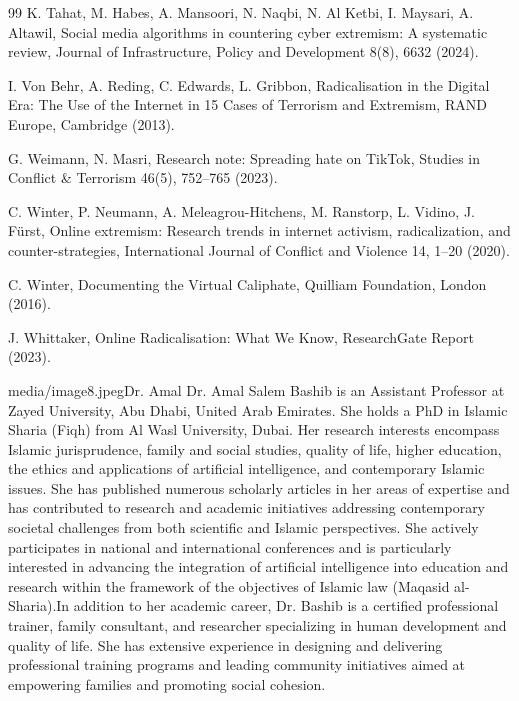 \documentclass{NSP1}
\begin{document}
\begin{thebibliography}{99}
K. Tahat, M. Habes, A. Mansoori, N. Naqbi, N. Al Ketbi, I. Maysari, A. Altawil, Social media algorithms in countering cyber extremism: A systematic review, Journal of Infrastructure, Policy and Development 8(8), 6632 (2024).

I. Von Behr, A. Reding, C. Edwards, L. Gribbon, Radicalisation in the Digital Era: The Use of the Internet in 15 Cases of Terrorism and Extremism, RAND Europe, Cambridge (2013).

G. Weimann, N. Masri, Research note: Spreading hate on TikTok, Studies in Conflict \& Terrorism 46(5), 752–765 (2023).

C. Winter, P. Neumann, A. Meleagrou-Hitchens, M. Ranstorp, L. Vidino, J. Fürst, Online extremism: Research trends in internet activism, radicalization, and counter-strategies, International Journal of Conflict and Violence 14, 1–20 (2020).

C. Winter, Documenting the Virtual Caliphate, Quilliam Foundation, London (2016).

J. Whittaker, Online Radicalisation: What We Know, ResearchGate Report (2023).

\end{thebibliography}




\begin{biographyps}{media/image8.jpeg}{Dr. Amal}
Dr. Amal Salem Bashib is an Assistant Professor at Zayed University, Abu Dhabi, United Arab Emirates. She holds a PhD in Islamic Sharia (Fiqh) from Al Wasl University, Dubai. Her research interests encompass Islamic jurisprudence, family and social studies, quality of life, higher education, the ethics and applications of artificial intelligence, and contemporary Islamic issues. She has published numerous scholarly articles in her areas of expertise and has contributed to research and academic initiatives addressing contemporary societal challenges from both scientific and Islamic perspectives. She actively participates in national and international conferences and is particularly interested in advancing the integration of artificial intelligence into education and research within the framework of the objectives of Islamic law (Maqasid al-Sharia).In addition to her academic career, Dr. Bashib is a certified professional trainer, family consultant, and researcher specializing in human development and quality of life. She has extensive experience in designing and delivering professional training programs and leading community initiatives aimed at empowering families and promoting social cohesion.\end{biographyps}
\end{document}
